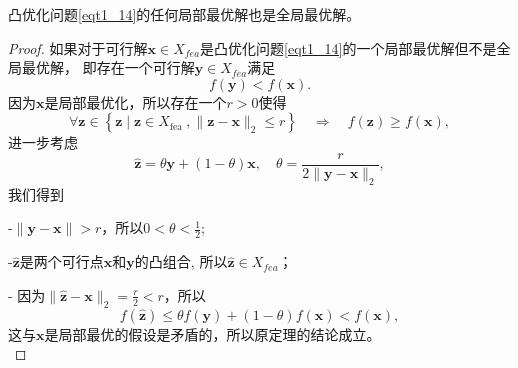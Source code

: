 \begin{theorem}
    凸优化问题\ref{eqt1_14}的任何局部最优解也是全局最优解。
    \label{the1_4}
\end{theorem}
\begin{proof}
    如果对于可行解$  \bm{x} \in X_{f e a} $是凸优化问题\ref{eqt1_14}的一个局部最优解但不是全局最优解， 即存在一个可行解$  \bm{y} \in X_{f e a}  $满足
    \begin{equation}
    f(\bm{y})<f(\bm{x}) .
        \nonumber
    \end{equation}
因为$\bm{x}$是局部最优化，所以存在一个$  r>0  $使得
    \begin{equation}
    \forall \bm{z} \in\left\{\bm{z} \mid \bm{z} \in X_{\text {fea }},\|\bm{z}-\bm{x}\|_{2} \leq r\right\} \quad \Rightarrow \quad f(\bm{z}) \geq f(\bm{x}),
        \nonumber
    \end{equation}
进一步考虑
\begin{equation}
\hat{\bm{z}}=\theta \bm{y}+(1-\theta) \bm{x}, \quad \theta=\frac{r}{2\|\bm{y}-\bm{x}\|_{2}} ,
    \nonumber
\end{equation}
我们得到
\par -$  \|\bm{y}-\bm{x}\|>r $，所以$  0<\theta<\frac{1}{2} $;
\par -$  \hat{\bm{z}}  $是两个可行点$\bm{x}$和$\bm{y}$的凸组合, 所以$  \hat{\bm{z}} \in X_{f e a} $；
\par - 因为$  \|\hat{\bm{z}}-\bm{x}\|_{2}=\frac{r}{2}<r $，所以
\begin{equation}
f(\hat{\bm{z}}) \leq \theta f(\bm{y})+(1-\theta) f(\bm{x})<f(\bm{x}),
    \nonumber
\end{equation}
这与$\bm{x}$是局部最优的假设是矛盾的，所以原定理的结论成立。\\
\end{proof}
